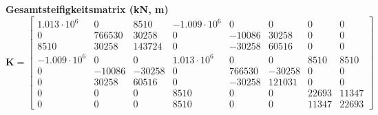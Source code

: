 \documentclass[11pt,a4paper]{article}
\begin{document}
\noindent\textbf{Gesamtsteifigkeitsmatrix (kN, m)}
\begin{equation*}
\mathbf{K} = \begin{bmatrix} 1.013 \cdot 10^{6} & 0 & 8510 & -1.009 \cdot 10^{6} & 0 & 0 & 0 & 0 \\ 0 & 766530 & 30258 & 0 & -10086 & 30258 & 0 & 0 \\ 8510 & 30258 & 143724 & 0 & -30258 & 60516 & 0 & 0 \\ -1.009 \cdot 10^{6} & 0 & 0 & 1.013 \cdot 10^{6} & 0 & 0 & 8510 & 8510 \\ 0 & -10086 & -30258 & 0 & 766530 & -30258 & 0 & 0 \\ 0 & 30258 & 60516 & 0 & -30258 & 121031 & 0 & 0 \\ 0 & 0 & 0 & 8510 & 0 & 0 & 22693 & 11347 \\ 0 & 0 & 0 & 8510 & 0 & 0 & 11347 & 22693 \end{bmatrix}
\end{equation*}
\end{document}
